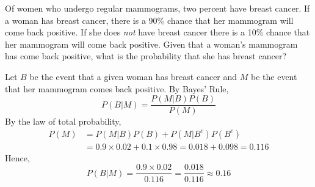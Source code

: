 \documentclass[addpoints,12pt]{exam}
\begin{document}
\begin{questions}
\question Of women who undergo regular mammograms, two percent have breast cancer. If a woman has breast cancer, there is a 90\% chance that her mammogram will come back positive. If she does \emph{not} have breast cancer there is a 10\% chance that her mammogram will come back positive. Given that a woman's mammogram has come back positive, what is the probability that she has breast cancer? 
	\begin{solution}
		 Let $B$ be the event that a given woman has breast cancer and $M$ be the event that her mammogram comes back positive. By Bayes' Rule,
		 		\[
          P(B|M) = \frac{P(M|B)P(B)}{P(M)}
        \]
	By the law of total probability, 
		 			\begin{align*}
		 			P(M) &= P(M|B)P(B) + P(M|B^c)P(B^c)\\
		 				&= 0.9 \times 0.02 + 0.1 \times 0.98  = 0.018 + 0.098 = 0.116
		 			\end{align*}
		 	Hence,
		 		\[
          P(B|M) = \frac{0.9 \times 0.02}{0.116} = \frac{0.018}{0.116} \approx 0.16
        \]
	\end{solution}



\end{questions}
\end{document}
